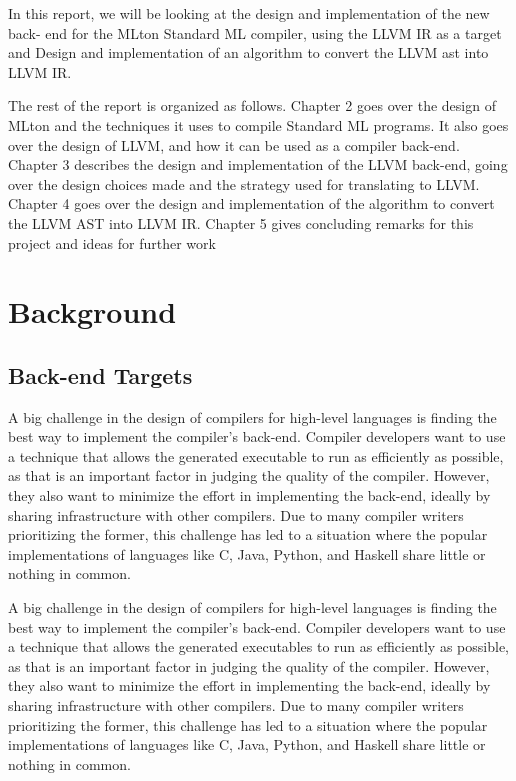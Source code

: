 \documentclass{book}
\begin{document}
In this report, we will be looking at the design and implementation of the new back-
end for the MLton Standard ML compiler, using the LLVM IR as a target and Design and implementation of an algorithm to convert the LLVM ast into LLVM IR.

The rest of the report is organized as follows. Chapter 2 goes over the design of MLton
and the techniques it uses to compile Standard ML programs.  It also goes over the design
of LLVM, and how it can be used as a compiler back-end.  Chapter 3 describes the design
and implementation of the LLVM back-end, going over the design choices made and the
strategy used for translating to LLVM. Chapter 4 goes over the design and implementation of the algorithm to convert the LLVM AST into LLVM IR. Chapter 5 gives concluding remarks for this project and ideas for further work

\chapter{Background}
\Large
	\section{Back-end Targets}
	A  big  challenge  in  the  design  of  compilers  for  high-level  languages  is  finding  the  best
	way to implement the compiler's back-end.  Compiler developers want to use a technique
	that allows the generated executable to run as efficiently as possible, as that is an important
	factor in judging the quality of the compiler. However, they also want to minimize the effort
	in implementing the back-end, ideally by sharing infrastructure with other compilers. Due
	to many compiler writers prioritizing the former, this challenge has led to a situation where
	the popular implementations of languages like C, Java, Python, and Haskell share little or
	nothing in common.
	
	A  big  challenge  in  the  design  of  compilers  for  high-level  languages  is  finding  the  best
	way to implement the compiler’s back-end.  Compiler developers want to use a technique
	that allows the generated executables to run as efficiently as possible, as that is an important
	factor in judging the quality of the compiler. However, they also want to minimize the effort
	in implementing the back-end, ideally by sharing infrastructure with other compilers. Due
	to many compiler writers prioritizing the former, this challenge has led to a situation where
	the popular implementations of languages like C, Java, Python, and Haskell share little or
	nothing in common.
	
\end{document}
